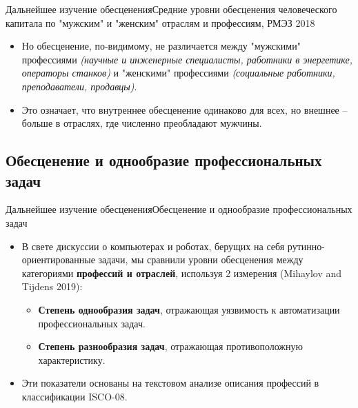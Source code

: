 \documentclass{beamer}
\begin{document}
\begin{frame}{Дальнейшее изучение обесценения}{Средние уровни обесценения человеческого капитала по "мужским" и "женским" отраслям и профессиям, РМЭЗ 2018}
\begin{itemize}
		\item Но обесценение, по-видимому, не различается между "мужскими" профессиями \textit{(научные и инженерные специалисты, работники в энергетике, операторы станков)} и "женскими" профессиями \textit{(социальные работники, преподаватели, продавцы)}.
		
		\item Это означает, что внутреннее обесценение одинаково для всех, но внешнее -- больше в отраслях, где численно преобладают мужчины. 
	\end{itemize}
\end{frame}

\subsection{Обесценение и однообразие профессиональных задач}

\begin{frame}{Дальнейшее изучение обесценения}{Обесценение и однообразие профессиональных задач}
	\begin{itemize}
		\item В свете дискуссии о компьютерах и роботах, берущих на себя рутинно-ориентированные задачи, мы сравнили уровни обесценения между категориями \textbf{профессий и отраслей}, используя 2 измерения (Mihaylov and Tijdens 2019):
			\begin{itemize}
				\item \textbf{Степень однообразия задач}, отражающая уязвимость к автоматизации профессиональных задач.   
				\item \textbf{Степень разнообразия задач}, отражающая противоположную характеристику.
			\end{itemize}
		\item Эти показатели основаны на текстовом анализе описания профессий в классификации ISCO-08.
	\end{itemize}
\end{frame}
\end{document}
